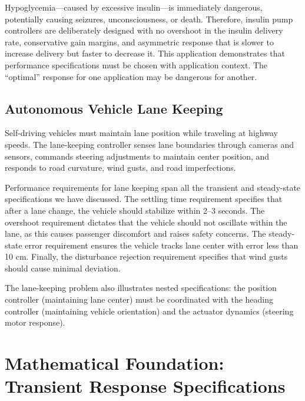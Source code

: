 Hypoglycemia---caused by excessive insulin---is immediately dangerous, potentially causing seizures, unconsciousness, or death. Therefore, insulin pump controllers are deliberately designed with no overshoot in the insulin delivery rate, conservative gain margins, and asymmetric response that is slower to increase delivery but faster to decrease it. This application demonstrates that performance specifications must be chosen with application context. The ``optimal'' response for one application may be dangerous for another.

\subsection{Autonomous Vehicle Lane Keeping}

Self-driving vehicles must maintain lane position while traveling at highway speeds. The lane-keeping controller senses lane boundaries through cameras and sensors, commands steering adjustments to maintain center position, and responds to road curvature, wind gusts, and road imperfections.

Performance requirements for lane keeping span all the transient and steady-state specifications we have discussed. The settling time requirement specifies that after a lane change, the vehicle should stabilize within 2--3 seconds. The overshoot requirement dictates that the vehicle should not oscillate within the lane, as this causes passenger discomfort and raises safety concerns. The steady-state error requirement ensures the vehicle tracks lane center with error less than 10 cm. Finally, the disturbance rejection requirement specifies that wind gusts should cause minimal deviation.

The lane-keeping problem also illustrates nested specifications: the position controller (maintaining lane center) must be coordinated with the heading controller (maintaining vehicle orientation) and the actuator dynamics (steering motor response).

\section{Mathematical Foundation: Transient Response Specifications}

